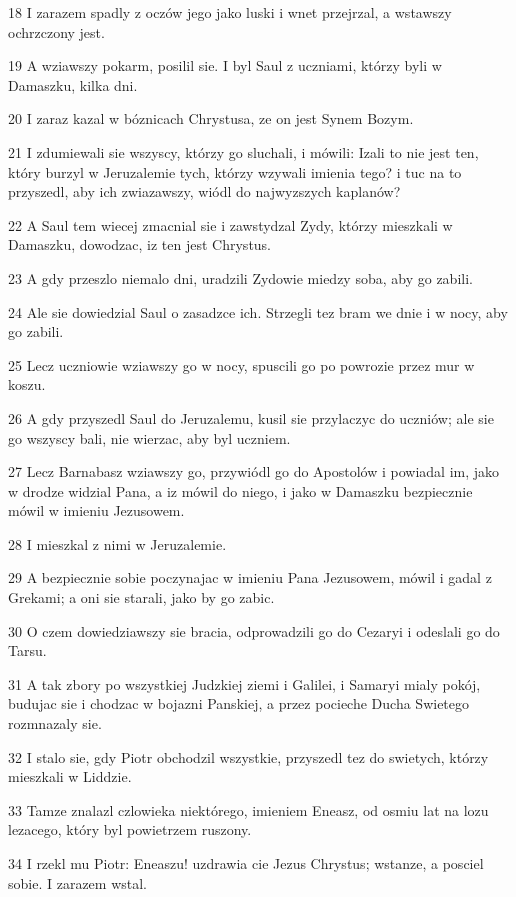 \par 18 I zarazem spadly z oczów jego jako luski i wnet przejrzal, a wstawszy ochrzczony jest.
\par 19 A wziawszy pokarm, posilil sie. I byl Saul z uczniami, którzy byli w Damaszku, kilka dni.
\par 20 I zaraz kazal w bóznicach Chrystusa, ze on jest Synem Bozym.
\par 21 I zdumiewali sie wszyscy, którzy go sluchali, i mówili: Izali to nie jest ten, który burzyl w Jeruzalemie tych, którzy wzywali imienia tego? i tuc na to przyszedl, aby ich zwiazawszy, wiódl do najwyzszych kaplanów?
\par 22 A Saul tem wiecej zmacnial sie i zawstydzal Zydy, którzy mieszkali w Damaszku, dowodzac, iz ten jest Chrystus.
\par 23 A gdy przeszlo niemalo dni, uradzili Zydowie miedzy soba, aby go zabili.
\par 24 Ale sie dowiedzial Saul o zasadzce ich. Strzegli tez bram we dnie i w nocy, aby go zabili.
\par 25 Lecz uczniowie wziawszy go w nocy, spuscili go po powrozie przez mur w koszu.
\par 26 A gdy przyszedl Saul do Jeruzalemu, kusil sie przylaczyc do uczniów; ale sie go wszyscy bali, nie wierzac, aby byl uczniem.
\par 27 Lecz Barnabasz wziawszy go, przywiódl go do Apostolów i powiadal im, jako w drodze widzial Pana, a iz mówil do niego, i jako w Damaszku bezpiecznie mówil w imieniu Jezusowem.
\par 28 I mieszkal z nimi w Jeruzalemie.
\par 29 A bezpiecznie sobie poczynajac w imieniu Pana Jezusowem, mówil i gadal z Grekami; a oni sie starali, jako by go zabic.
\par 30 O czem dowiedziawszy sie bracia, odprowadzili go do Cezaryi i odeslali go do Tarsu.
\par 31 A tak zbory po wszystkiej Judzkiej ziemi i Galilei, i Samaryi mialy pokój, budujac sie i chodzac w bojazni Panskiej, a przez pocieche Ducha Swietego rozmnazaly sie.
\par 32 I stalo sie, gdy Piotr obchodzil wszystkie, przyszedl tez do swietych, którzy mieszkali w Liddzie.
\par 33 Tamze znalazl czlowieka niektórego, imieniem Eneasz, od osmiu lat na lozu lezacego, który byl powietrzem ruszony.
\par 34 I rzekl mu Piotr: Eneaszu! uzdrawia cie Jezus Chrystus; wstanze, a posciel sobie. I zarazem wstal.
